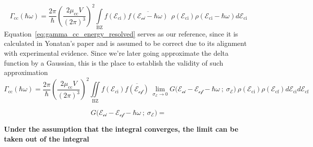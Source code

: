 \begin{equation}
\Gamma_{\text{cc}}(\hbar\omega) = \frac{2\pi}{\hbar}\left( \frac{2\mu_{\text{cc}}V}{(2\pi)^{3}} \right)^{2} \int\limits_{\text{BZ}} f(\mathcal{E}_{c\text{i}})\overline{f(\mathcal{E_{\text{ci}}}-\hbar\omega)} \ \ \rho(\mathcal{E}_{\text{ci}}) \rho(\mathcal{E}_{\text{ci}}-\hbar\omega)d\mathcal{E}_{\text{ci}}
\label{eq:gamma_cc_energy_resolved}
\end{equation}
Equation~\eqref{eq:gamma_cc_energy_resolved} serves as our reference, since it is calculated in Yonatan's paper and is assumed to be correct due to its alignment with experimental evidence. Since we're later going approximate the delta function by a Gaussian, this is the place to establish the validity of such approximation
\begin{equation}
\Gamma_{\text{cc}}(\hbar\omega) = \frac{2\pi}{\hbar}\left( \frac{2\mu_{\text{cc}}V}{(2\pi)^{3}} \right)^{2} \iint\limits_{\text{BZ}} f(\mathcal{E}_{c\text{i}})\overline{f(\mathcal{E_{\text{cf}}})} \ \lim\limits_{\sigma_{\mathcal{E}}\to 0} G\Big(\mathcal{E_{\text{ci}}-\mathcal{E}_{\text{cf}}-\hbar\omega} \ ; \ \sigma_{\mathcal{E}}\Big) \ \rho(\mathcal{E}_{\text{ci}}) \rho(\mathcal{E}_{\text{cf}})d\mathcal{E}_{\text{ci}}d\mathcal{E}_{\text{cf}}
\label{eq:gamma_cc_gaussian_limit}
\end{equation}

\begin{equation}
G\Big(\mathcal{E_{\text{ci}}-\mathcal{E}_{\text{cf}}-\hbar\omega} \ ; \ \sigma_{\mathcal{E}}\Big) = 
\label{eq:gaussian_definition_placeholder}
\end{equation}

\textbf{Under the assumption that the integral converges, the limit can be taken out of the integral}
